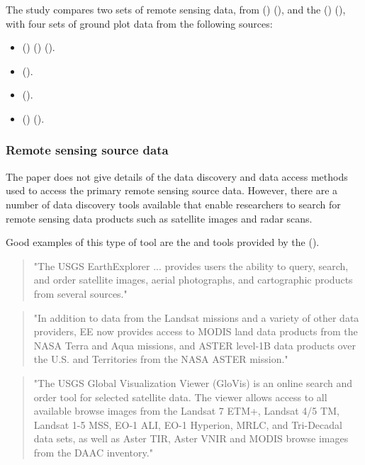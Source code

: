 \documentclass{article}
\begin{document}
The study compares two sets of remote sensing data,
from  (\cite{nasa-jpl-carbon})
 (\cite{saatchi-2011}), and the 
(\cite{whrc})  (\cite{baccini-2012}), with four
sets of ground plot data from the following sources:

\begin{itemize}
    \item{} (\cite{rainfor}) (\cite{peacock-2007})
    (\cite{malhi-2009}).
    \item{} (\cite{atdn}).
    \item{} (\cite{team}).
    \item{} (\cite{ppbio}) (\cite{pezzini-2012}).
\end{itemize}

\subsubsection{Remote sensing source data}

The paper does not give details of the data discovery and data access
methods used to access the primary remote sensing source data.
However, there are a number of data discovery tools available that enable
researchers to search for remote sensing data products such as satellite
images and radar scans.

Good examples of this type of tool are the \cite{usgs-explorer} and
\cite{usgs-glovis} tools provided by the  (\cite{usgs}).

\begin{quote}
"The USGS EarthExplorer ... provides users the ability to query, search,
and order satellite images, aerial photographs, and cartographic products
from several sources."
\end{quote}

\begin{quote}
"In addition to data from the Landsat missions and a variety of other data
providers, EE now provides access to MODIS land data products from the NASA
Terra and Aqua missions, and ASTER level-1B data products over the U.S. and
Territories from the NASA ASTER mission."
\end{quote}

\begin{quote}
"The USGS Global Visualization Viewer (GloVis) is an online search and order
tool for selected satellite data. The viewer allows access to all available
browse images from the Landsat 7 ETM+, Landsat 4/5 TM, Landsat 1-5 MSS,
EO-1 ALI, EO-1 Hyperion, MRLC, and Tri-Decadal data sets, as well as Aster
TIR, Aster VNIR and MODIS browse images from the DAAC inventory."
\end{quote}
\end{document}
